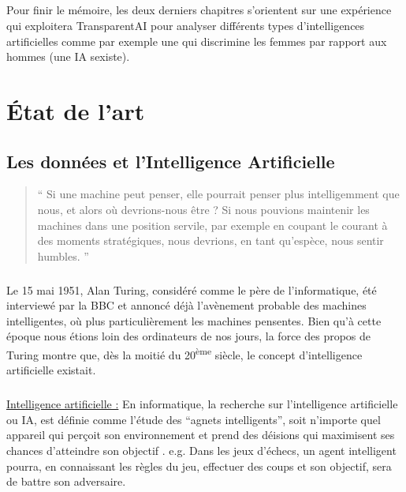 \documentclass[10pt, french, a4paper]{report}
\begin{document}
\paragraph{}
Pour finir le mémoire, les deux derniers chapitres s'orientent sur une expérience qui exploitera TransparentAI pour analyser différents types d'intelligences artificielles comme par exemple une qui discrimine les femmes par rapport aux hommes (une IA sexiste). 

\chapter{\uppercase{é}tat de l'art}
\label{chap:etat_art}

\section{Les données et l'Intelligence Artificielle}
\label{sec:ia}

\begin{quotation}
  `` Si une machine peut penser, elle pourrait penser plus intelligemment que nous, et alors où devrions-nous être ? Si nous pouvions maintenir les machines dans une position servile, par exemple en coupant le courant à des moments stratégiques, nous devrions, en tant qu'espèce, nous sentir humbles. ''
\end{quotation}

\paragraph{}
Le 15 mai 1951, Alan Turing, considéré comme le père de l'informatique, été interviewé par la BBC et annoncé déjà l'avènement probable des machines intelligentes, où plus particulièrement les machines pensentes. Bien qu'à cette époque nous étions loin des ordinateurs de nos jours, la force des propos de Turing montre que, dès la moitié du 20\textsuperscript{ème} siècle, le concept d'intelligence artificielle existait.

\paragraph{}
\underline{Intelligence artificielle :} En informatique, la recherche sur l'intelligence artificielle ou IA, est définie comme l'étude des ``agnets intelligents'', soit n'importe quel appareil qui perçoit son environnement et prend des déisions qui maximisent ses chances d'atteindre son objectif \citep{poole_computational_1997}. e.g. Dans les jeux d’échecs, un agent intelligent pourra, en connaissant les règles du jeu, effectuer des coups et son objectif, sera de battre son adversaire.
\end{document}

